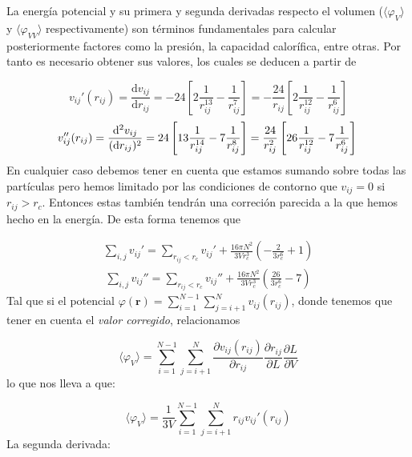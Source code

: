 \documentclass[11pt]{article}
\newcommand{\rn}{\mathbf{r}}
\newcommand{\parentesis}[1]{\left( #1  \right)}
\newcommand{\parciales}[2]{\frac{\partial #1}{\partial #2}}
\newcommand{\ccorchetes}[1]{\left[ #1  \right]}
\newcommand{\D}{\mathrm{d}}
\newcommand{\derivadas}[2]{\frac{\D #1}{\D #2}}
\begin{document}
La energía potencial y su primera y segunda derivadas respecto el volumen ($\langle \varphi_V \rangle$ y $\langle \varphi_{VV} \rangle$ respectivamente) son términos fundamentales para calcular posteriormente factores como la presión, la capacidad calorífica, entre otras. Por tanto es necesario obtener sus valores, los cuales se deducen a partir de 

\begin{equation}
	v_{ij}' (r_{ij}) = \derivadas{v_{ij}}{r_{ij}} = -24 \ccorchetes{2\frac{1}{r_{ij}^{13}}- \frac{1}{r_{ij}^7}} = -\frac{24}{r_{ij}} \ccorchetes{2\frac{1}{r_{ij}^{12}} - \frac{1}{r_{ij}^6}} 
\end{equation}	
\begin{equation}
	v_{ij}''(r_{ij}) = \frac{\D^2v_{ij}}{(\D r_{ij})^2} = 24 \ccorchetes{13\frac{1}{r_{ij}^{14}}- 7\frac{1}{r_{ij}^8}} = \frac{24}{r_{ij}^2} \ccorchetes{26\frac{1}{r_{ij}^{12}}- 7\frac{1}{r_{ij}^6}} \\ 
\end{equation}
En cualquier caso debemos tener en cuenta que estamos sumando sobre todas las partículas pero hemos limitado por las condiciones de contorno que $v_{ij}=0$ si $r_{ij}>r_c$. Entonces estas también tendrán una correción parecida a la que hemos hecho en la energía. De esta forma tenemos que 

\begin{eqnarray}
\sum_{i,j} v_{ij}' = \sum_{r_{ij}<r_c} v_{ij}'  + \frac{16\pi N^2}{3V r_c^3} \parentesis{-\frac{2}{3 r_c^6}+1}
\end{eqnarray}
\begin{eqnarray}
\sum_{i,j} v_{ij}'' = \sum_{r_{ij}<r_c} v_{ij}''  + \frac{16\pi N^2}{3V r_c^3} \parentesis{\frac{26}{3 r_c^6}-7}
\end{eqnarray}
Tal que si el potencial $\varphi(\rn) = \sum_{i=1}^{N-1} \sum_{j=i+1}^N v_{ij} (r_{ij})$, donde tenemos que tener en cuenta el \textit{valor corregido}, relacionamos 


\begin{equation}
	\langle \varphi_V \rangle = \sum_{i=1}^{N-1}\sum_{j=i+1}^{N} \parciales{v_{ij} (r_{ij})}{r_{ij}} \parciales{r_{ij}}{L} \parciales{L}{V}
\end{equation}
lo que nos lleva a que:

\begin{equation}
	\langle \varphi_V \rangle = \frac{1}{3V} \sum_{i=1}^{N-1}\sum_{j=i+1}^{N}  r_{ij} v_{ij}'(r_{ij})
\end{equation}
La segunda derivada:
\end{document}
